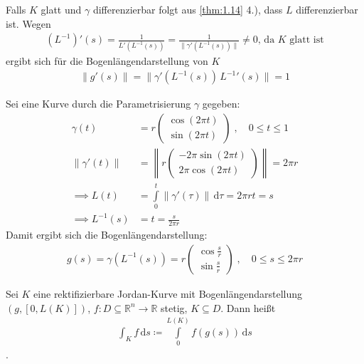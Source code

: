\begin{notice}[Folgerung:]
  Falls $K$ glatt und $\gamma$ differenzierbar folgt aus \ref{thm:1.14} 4.), dass $L$ differenzierbar ist. Wegen
  \begin{align*}
    (L^{-1})'(s) = \frac{1}{L'(L^{-1}(s))} = \frac{1}{\|\gamma'(L^{-1}(s))\|} \neq 0 \text{, da $K$ glatt ist} 
  \end{align*}
  ergibt sich für die Bogenlängendarstellung von $K$
  \begin{align*}
    \|g'(s)\| = \|\gamma'(L^{-1}(s)) \, {L^{-1}}'(s)\| = 1
  \end{align*}
\end{notice}

\begin{example}
  Sei eine Kurve durch die Parametrisierung $\gamma$ gegeben:
  \begin{align*}
    \gamma(t) &= r \begin{pmatrix} \cos(2 \pi t) \\ \sin(2 \pi t) \end{pmatrix} \; , \quad 0 \leq t \leq 1 \\
    \|\gamma'(t)\| &= \left\| r \begin{pmatrix} -2 \pi \sin(2 \pi t) \\ 2 \pi \cos(2 \pi t) \end{pmatrix} \right\| = 2 \pi r \\
    \implies L(t) &= \int\limits_{0}^{t} \|\gamma'(\tau)\| \, \mathrm{d}\tau = 2 \pi r t = s \\
    \implies L^{-1}(s) &= t = \frac{s}{2 \pi r}
  \end{align*}
  Damit ergibt sich die Bogenlängendarstellung:
  \begin{align*}
    g(s) = \gamma(L^{-1}(s)) = r \begin{pmatrix} \cos\frac{s}{r} \\ \sin\frac{s}{r} \end{pmatrix} \; , \quad 0 \leq s \leq 2 \pi r
  \end{align*}
\end{example}

\begin{theorem}[Definition]
  Sei $K$ eine rektifizierbare Jordan-Kurve mit Bogenlängendarstellung $(g, [0,L(K)])$, $f : D \subseteq \mathbb{R}^n \to \mathbb{R}$ stetig, $K \subseteq D$. Dann heißt
  \begin{align*}
    \int_K f \, \mathrm{d}s \coloneq \int\limits_{0}^{L(K)} f(g(s)) \, \mathrm{d}s
  \end{align*}
  .
\end{theorem}

